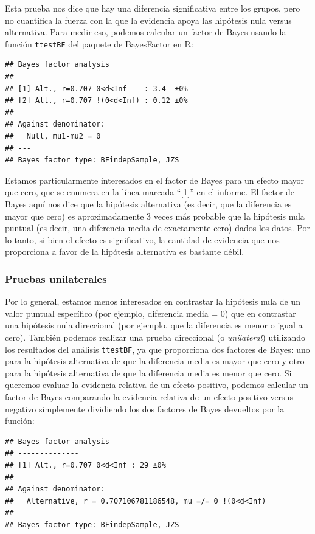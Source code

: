 \documentclass[
  12pt,
]{book}
\begin{document}
Esta prueba nos dice que hay una diferencia significativa entre los grupos, pero no cuantifica la fuerza con la que la evidencia apoya las hipótesis nula versus alternativa. Para medir eso, podemos calcular un factor de Bayes usando la función \texttt{ttestBF} del paquete de BayesFactor en R:

\begin{verbatim}
## Bayes factor analysis
## --------------
## [1] Alt., r=0.707 0<d<Inf    : 3.4  ±0%
## [2] Alt., r=0.707 !(0<d<Inf) : 0.12 ±0%
## 
## Against denominator:
##   Null, mu1-mu2 = 0 
## ---
## Bayes factor type: BFindepSample, JZS
\end{verbatim}

Estamos particularmente interesados en el factor de Bayes para un efecto mayor que cero, que se enumera en la línea marcada ``{[}1{]}'' en el informe. El factor de Bayes aquí nos dice que la hipótesis alternativa (es decir, que la diferencia es mayor que cero) es aproximadamente 3 veces más probable que la hipótesis nula puntual (es decir, una diferencia media de exactamente cero) dados los datos. Por lo tanto, si bien el efecto es significativo, la cantidad de evidencia que nos proporciona a favor de la hipótesis alternativa es bastante débil.

\hypertarget{pruebas-unilaterales}{%
\subsubsection{Pruebas unilaterales}\label{pruebas-unilaterales}}

Por lo general, estamos menos interesados en contrastar la hipótesis nula de un valor puntual específico (por ejemplo, diferencia media = 0) que en contrastar una hipótesis nula direccional (por ejemplo, que la diferencia es menor o igual a cero). También podemos realizar una prueba direccional (o \emph{unilateral}) utilizando los resultados del análisis \texttt{ttestBF}, ya que proporciona dos factores de Bayes: uno para la hipótesis alternativa de que la diferencia media es mayor que cero y otro para la hipótesis alternativa de que la diferencia media es menor que cero. Si queremos evaluar la evidencia relativa de un efecto positivo, podemos calcular un factor de Bayes comparando la evidencia relativa de un efecto positivo versus negativo simplemente dividiendo los dos factores de Bayes devueltos por la función:

\begin{verbatim}
## Bayes factor analysis
## --------------
## [1] Alt., r=0.707 0<d<Inf : 29 ±0%
## 
## Against denominator:
##   Alternative, r = 0.707106781186548, mu =/= 0 !(0<d<Inf) 
## ---
## Bayes factor type: BFindepSample, JZS
\end{verbatim}
\end{document}
